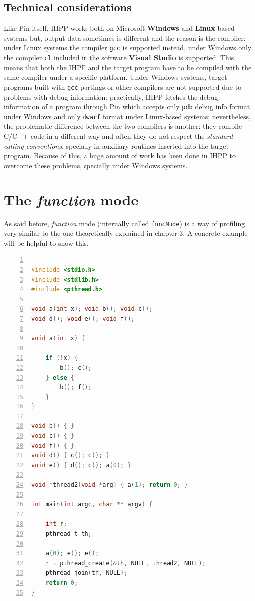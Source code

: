 \documentclass[a4paper,10pt]{report}
\begin{document}
\subsection{Technical considerations}

Like Pin itself, IHPP works both on Microsoft \textbf{Windows} and \textbf{Linux}-based systems but, output data sometimes is different and the reason is the compiler: 
under Linux systems the compiler \verb|gcc| is supported instead, under Windows only the compiler \verb|cl| included in the software \textbf{Visual Studio} is supported. 
This means that both the IHPP and the target program have to be compiled with the same compiler under a specific platform. Under Windows systems, target programs built with \verb|gcc| portings or other compilers are not supported due to problems with debug information: 
practically, IHPP fetches the debug information of a program through Pin which accepts only \verb|pdb| debug info format under Windows and only \verb|dwarf| format under Linux-based systems; nevertheless, the problematic difference between the two compilers is another: 
they compile C/C++ code in a different way and often they do not respect the \emph{standard calling conventions}, specially in auxiliary routines inserted into the target program. 
Because of this, a huge amount of work has been done in IHPP to overcome these problems, 
specially under Windows systems.

\section{The \emph{function} mode}

As said before, \emph{function} mode (internally called \verb|funcMode|) 
is a way of profiling very similar to the one theoretically explained in chapter 3.
A concrete example will be helpful to show this.

\begin{lstlisting}[language=C, 
	caption={prog1.c, a simple multi-threaded program}, 
	label=prog1, frame=leftline, numbers=left]

#include <stdio.h>
#include <stdlib.h>
#include <pthread.h>

void a(int x); void b(); void c();
void d(); void e(); void f();

void a(int x) { 

	if (!x) { 
		b(); c(); 
	} else { 
		b(); f();
	} 
}

void b() { }
void c() { }
void f() { }
void d() { c(); c(); }
void e() { d(); c(); a(0); }

void *thread2(void *arg) { a(1); return 0; }

int main(int argc, char ** argv) {

	int r;
	pthread_t th;

	a(0); e(); e();
	r = pthread_create(&th, NULL, thread2, NULL);
	pthread_join(th, NULL);
	return 0;
}

\end{lstlisting}
\end{document}
